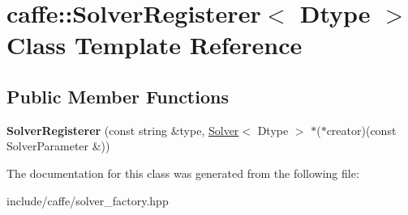\hypertarget{classcaffe_1_1SolverRegisterer}{}\section{caffe\+:\+:Solver\+Registerer$<$ Dtype $>$ Class Template Reference}
\label{classcaffe_1_1SolverRegisterer}
\subsection*{Public Member Functions}
\begin{DoxyCompactItemize}
\item 
{\bfseries Solver\+Registerer} (const string \&type, \hyperlink{classcaffe_1_1Solver}{Solver}$<$ Dtype $>$ $\ast$($\ast$creator)(const Solver\+Parameter \&))\hypertarget{classcaffe_1_1SolverRegisterer_ace7fc4d017af675cbbe49214ca77258b}{}\label{classcaffe_1_1SolverRegisterer_ace7fc4d017af675cbbe49214ca77258b}

\end{DoxyCompactItemize}


The documentation for this class was generated from the following file\+:\begin{DoxyCompactItemize}
\item 
include/caffe/solver\+\_\+factory.\+hpp\end{DoxyCompactItemize}
